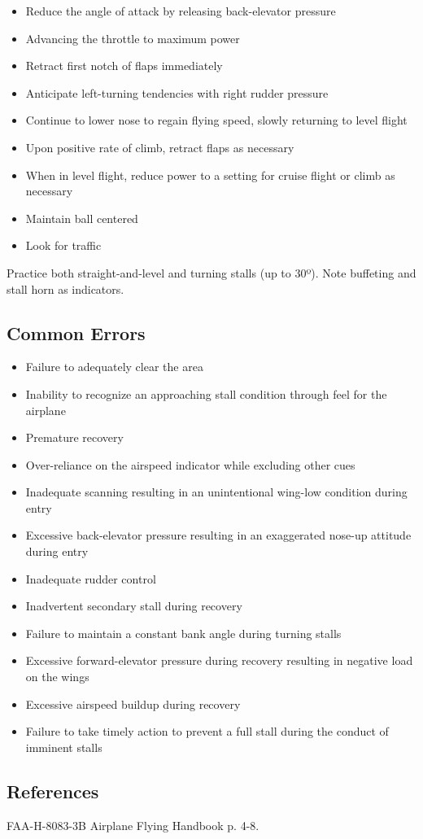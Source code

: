 \begin{itemize}
  \item Reduce the angle of attack by releasing back-elevator pressure
  \item Advancing the throttle to maximum power
  \item Retract first notch of flaps immediately
  \item Anticipate left-turning tendencies with right rudder pressure
  \item Continue to lower nose to regain flying speed, slowly returning to
    level flight
  \item Upon positive rate of climb, retract flaps as necessary 
  \item When in level flight, reduce power to a setting for cruise flight or
    climb as necessary
  \item Maintain ball centered
  \item Look for traffic
\end{itemize}

Practice both straight-and-level and turning stalls (up to 30º). Note buffeting
and stall horn as indicators.

\subsection{Common Errors}

\begin{itemize}
  \item Failure to adequately clear the area
  \item Inability to recognize an approaching stall condition through feel for
    the airplane
  \item Premature recovery
  \item Over-reliance on the airspeed indicator while excluding other cues
  \item Inadequate scanning resulting in an unintentional wing-low condition
    during entry
  \item Excessive back-elevator pressure resulting in an exaggerated nose-up
    attitude during entry
  \item Inadequate rudder control
  \item Inadvertent secondary stall during recovery
  \item Failure to maintain a constant bank angle during turning stalls
  \item Excessive forward-elevator pressure during recovery resulting in
    negative load on the wings
  \item Excessive airspeed buildup during recovery
  \item Failure to take timely action to prevent a full stall during the
    conduct of imminent stalls
\end{itemize}

\subsection{References}

FAA-H-8083-3B Airplane Flying Handbook p. 4-8.
